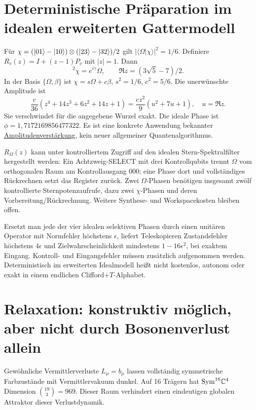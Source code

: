\section{Deterministische Präparation im idealen erweiterten Gattermodell}
Für $\chi=(\lvert01\rangle-\lvert10\rangle)\otimes(\lvert23\rangle-\lvert32\rangle)/2$ gilt $|\langle\Omega|\chi\rangle|^2=1/6$. Definiere $R_v(z)=I+(z-1)P_v$ mit $|z|=1$. Dann
\begin{equation}
[R_\chi(z)R_\Omega(z)]^2\chi=e^{i\gamma}\Omega,\qquad
\Re z=(3\sqrt5-7)/2.
\end{equation}
In der Basis $\{\Omega,\beta\}$ ist $\chi=s\Omega+c\beta$, $s^2=1/6$, $c^2=5/6$. Die unerwünschte Amplitude ist
\begin{equation}
\frac{c}{36}(z^4+14z^3+6z^2+14z+1)
=\frac{cz^2}{9}(u^2+7u+1),\quad u=\Re z.
\end{equation}
Sie verschwindet für die angegebene Wurzel exakt. Die ideale Phase ist $\phi=1{,}7172169856477322$. Es ist eine konkrete Anwendung bekannter \href{https://arxiv.org/abs/quant-ph/0005055}{Amplitudenverstärkung}, kein neuer allgemeiner Quantenalgorithmus.

$R_\Omega(z)$ kann unter kontrolliertem Zugriff auf den idealen Stern-Spektralfilter hergestellt werden: Ein Achtzweig-SELECT mit drei Kontrollqubits trennt $\Omega$ vom orthogonalen Raum am Kontrollausgang 000; eine Phase dort und vollständiges Rückrechnen setzt das Register zurück. Zwei $\Omega$-Phasen benötigen insgesamt zwölf kontrollierte Sternpotenzaufrufe, dazu zwei $\chi$-Phasen und deren Vorbereitung/Rückrechnung. Weitere Synthese- und Workspacekosten bleiben offen.

Ersetzt man jede der vier idealen selektiven Phasen durch einen unitären Operator mit Normfehler höchstens $\epsilon$, liefert Teleskopieren Zustandsfehler höchstens $4\epsilon$ und Zielwahrscheinlichkeit mindestens $1-16\epsilon^2$, bei exaktem Eingang. Kontroll- und Eingangsfehler müssen zusätzlich aufgenommen werden. Deterministisch im erweiterten Idealmodell heißt nicht kostenlos, autonom oder exakt in einem endlichen Clifford+$T$-Alphabet.

\section{Relaxation: konstruktiv möglich, aber nicht durch Bosonenverlust allein}
Gewöhnliche Vermittlerverluste $L_\mu=b_\mu$ lassen vollständig symmetrische Farbzustände mit Vermittlervakuum dunkel. Auf 16 Trägern hat $\mathrm{Sym}^{16}\mathbb C^4$ Dimension $\binom{19}{3}=969$. Dieser Raum verhindert einen eindeutigen globalen Attraktor dieser Verlustdynamik.


